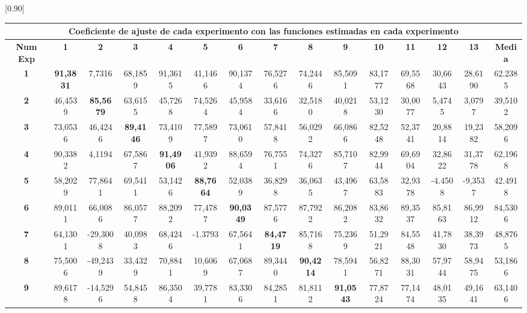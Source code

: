 \begin{table}[p]\label{tablaA1.2}
\centering
\begin{sideways}
\scalebox{0.80}[0.90]{
	\begin{tabular}{| c | c | c | c | c | c | c | c | c | c | c | c | c | c | c |}
		\hline
		\multicolumn{15}{|c|}{Coeficiente de ajuste de cada experimento con las funciones estimadas en cada experimento} \\
		\hline
		\textbf{Num Exp} & \textbf{1} & \textbf{2} & \textbf{3} & \textbf{4} & \textbf{5} &\textbf{6} & \textbf{7} & \textbf{8} & \textbf{9} & \textbf{10} & \textbf{11} & \textbf{12} & \textbf{13} & \textbf{Media}\\
		\hline 
			\textbf{1} & \textbf{91,3831} &   7,7316 & 68,1859 & 91,3615 & 41,1466 & 90,1374  & 76,5276  & 74,2446  & 85,5091 &  83,1777 &  69,5568 & 30,6643 &  28,6190  & 62.2385 \\
		\hline
     			\textbf{2} & 46,4539 & \textbf{85,5679} & 63,6155 & 45,7268 & 74,5264 & 45,9584  & 33,6166  & 32,5180  & 40,0218 &  53,1230 &  30,0077 &   5,4745 &    3,0797  & 39,5102 \\
		\hline
			\textbf{3} & 73,0536 & 46,4246 & \textbf{89,4146} & 73,4109 & 77,5897 & 73,0610  & 57,8418  & 56,0292  & 66,0866 &  82,5248 &  52,3741 & 20,8814 &  19,2382  & 58,2096 \\
		\hline
			\textbf{4} & 90,3382 &   4,1194 & 67,5867 & \textbf{91,4906} & 41,9392 & 88,6594  & 76,7551  & 74,3276  & 85,7107 &  82,9944 &  69,6904 & 32,8622 &  31,3778  & 62,1968 \\
		\hline
			\textbf{5}& 58,2029  & 77,8641 & 69,5411 & 53,1426 & \textbf{88,7664} & 52,0389  & 36,8298  & 36,0635  & 43,4967 &  63,5883 &  32,9378 &  -4.4508 &  -9,3537  & 42.4918 \\
		\hline
			\textbf{6} & 89,0111  & 66,0086 & 86,0577 & 88,2092 & 77,4787 & \textbf{90,0349}  & 87,5776  & 87,7922  & 86,2082 &  83,8632 &  89,3537 & 85,8163 &  86,9912  & 84,5306 \\
		\hline
			\textbf{7} & 64,1301  &-29,3008 & 40,0983 & 68,4246 & -1.3793 & 67,5641  & \textbf{84,4719}  & 85,7168  & 75,2369 &  51,2921 &  84,5548 &  41,7830 & 38,3973  & 48,8765 \\
		\hline
			\textbf{8} & 75,5006  &-49,2439 & 33,4329 & 70,8841 & 10,6069& 67,0687  & 89,3440  & \textbf{90,4214}  & 78,5941 &  56,8271  &  88,3031 & 57,9744 & 58,9475  & 53,1866 \\
		\hline
			\textbf{9} & 89,6178  &-14,5296 & 54,8458 & 86,3504 & 39,7781& 83,3306  & 84,2851  & 81,8112  & \textbf{91,0543} &  77,8724  &  77,1474 & 48,0135 & 49,1641  & 63,1406 \\ 

\end{tabular}}
\end{sideways}
\end{table}

